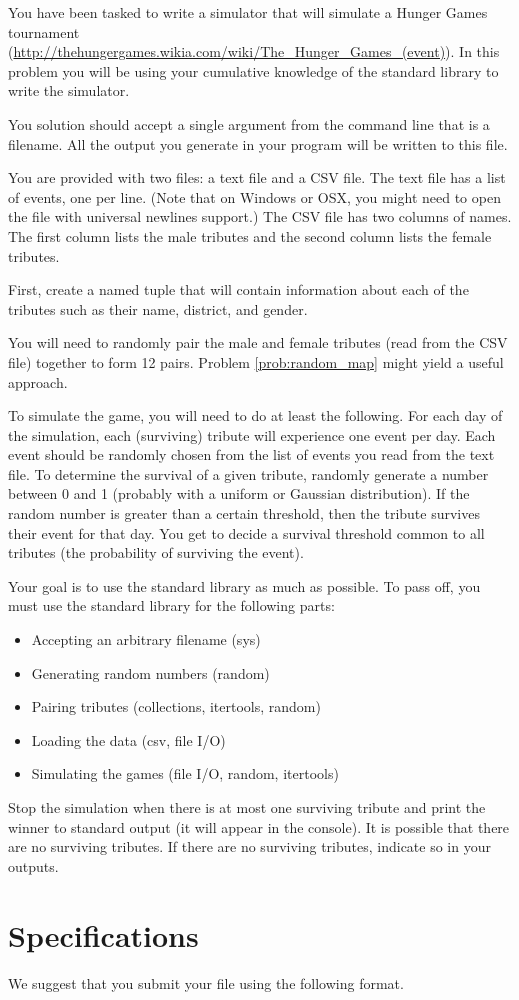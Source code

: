 \begin{problem}
You have been tasked to write a simulator that will simulate a Hunger Games tournament (\url{http://thehungergames.wikia.com/wiki/The_Hunger_Games_(event)}).
In this problem you will be using your cumulative knowledge of the standard library to write the simulator.

You solution should accept a single argument from the command line that is a filename.  All the output you generate in your program will be written to this file.

You are provided with two files: a text file and a CSV file.
The text file has a list of events, one per line.
(Note that on Windows or OSX, you might need to open the file with universal newlines support.)
The CSV file has two columns of names.
The first column lists the male tributes and the second column lists the female tributes.

First, create a named tuple that will contain information about each of the tributes such as their name, district, and gender.

You will need to randomly pair the male and female tributes (read from the CSV file) together to form 12 pairs.
Problem \ref{prob:random_map} might yield a useful approach.

To simulate the game, you will need to do at least the following.
For each day of the simulation, each (surviving) tribute will experience one event per day. Each event should be randomly chosen from the list of events you read from the text file.
To determine the survival of a given tribute, randomly generate a number between 0 and 1 (probably with a uniform or Gaussian distribution).
If the random number is greater than a certain threshold, then the tribute survives their event for that day.
You get to decide a survival threshold common to all tributes (the probability of surviving the event).

Your goal is to use the standard library as much as possible.
To pass off, you must use the standard library for the following parts:
\begin{itemize}
\item Accepting an arbitrary filename (sys)
\item Generating random numbers (random)
\item Pairing tributes (collections, itertools, random)
\item Loading the data (csv, file I/O)
\item Simulating the games (file I/O, random, itertools)
\end{itemize}

Stop the simulation when there is at most one surviving tribute and print the winner to standard output (it will appear in the console).  It is possible that there are no surviving tributes.  If there are no surviving tributes, indicate so in your outputs.

\end{problem}

\section*{Specifications}
We suggest that you submit your  file using the following format.





